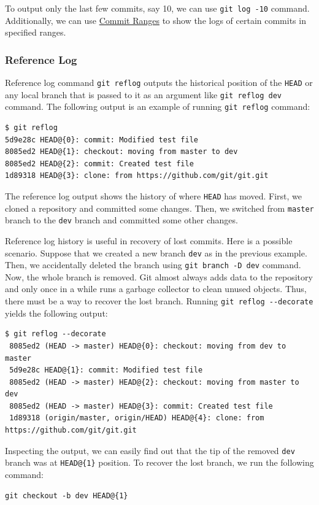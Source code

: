 \documentclass[11pt]{article}
\begin{document}
To output only the last few commits, say 10, we can use \texttt{git log -10} command. Additionally, we can use \hyperref[orgtarget3]{Commit Ranges} to show the logs of certain commits in specified ranges.

\subsubsection{Reference Log}
\label{sec:orgheadline16}
Reference log command \texttt{git reflog} outputs the historical position of the \texttt{HEAD} or any local branch that is passed to it as an argument like \texttt{git reflog dev} command. The following output is an example of running \texttt{git reflog} command:
\begin{verbatim}
$ git reflog
5d9e28c HEAD@{0}: commit: Modified test file
8085ed2 HEAD@{1}: checkout: moving from master to dev
8085ed2 HEAD@{2}: commit: Created test file
1d89318 HEAD@{3}: clone: from https://github.com/git/git.git
\end{verbatim}
The reference log output shows the history of where \texttt{HEAD} has moved. First, we cloned a repository and committed some changes. Then, we switched from \texttt{master} branch to the \texttt{dev} branch and committed some other changes.

Reference log history is useful in recovery of lost commits. Here is a possible scenario. Suppose that we created a new branch \texttt{dev} as in the previous example. Then, we accidentally deleted the branch using \texttt{git branch -D dev} command. Now, the whole branch is removed. Git almost always adds data to the repository and only once in a while runs a garbage collector to clean unused objects. Thus, there must be a way to recover the lost branch. Running \texttt{git reflog -{}-decorate} yields the following output:
\begin{verbatim}
$ git reflog --decorate
 8085ed2 (HEAD -> master) HEAD@{0}: checkout: moving from dev to master
 5d9e28c HEAD@{1}: commit: Modified test file
 8085ed2 (HEAD -> master) HEAD@{2}: checkout: moving from master to dev
 8085ed2 (HEAD -> master) HEAD@{3}: commit: Created test file
 1d89318 (origin/master, origin/HEAD) HEAD@{4}: clone: from https://github.com/git/git.git
\end{verbatim}
Inspecting the output, we can easily find out that the tip of the removed \texttt{dev} branch was at \texttt{HEAD@\{1\}} position. To recover the lost branch, we run the following command:
\begin{verbatim}
git checkout -b dev HEAD@{1}
\end{verbatim}
\end{document}
